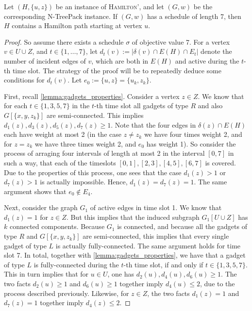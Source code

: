 \documentclass[runningheads]{llncs}
\newcommand{\set}[1]{\{ #1 \}}
\newcommand{\fromto}[2]{\set{#1, \ldots, #2}}
\newcommand{\xxxNTP}{{\sc N-TreePack}}
\begin{document}
\begin{lemma}
\label{lemma:inapprox-only-if}
Let $(H, \set{u, z})$ be an instance of \textsc{Hamilton'}, and let $(G, w)$ be the corresponding {\xxxNTP} instance. If $(G, w)$ has a schedule of length 7, then $H$ contains a Hamilton path starting at vertex $u$.
\end{lemma}
\begin{proof}
 So assume there exists a schedule $\sigma$ of objective value 7. For a vertex $v \in U \cup Z$, and $t \in \fromto{1}{7}$, let $d_t(v) := |\delta(v) \cap E(H) \cap E_t|$ denote the number of incident edges of $v$, which are both in $E(H)$ and active during the $t$-th time slot. The strategy of the proof will be to repeatedly deduce some conditions for $d_t(v)$. Let $e_0 := \set{u, z} = \set{u_k, z_k}$.

First, recall \cref{lemma:gadgets_properties}. Consider a vertex $z \in Z$. We know that for each $t \in \set{1, 3, 5, 7}$ in the $t$-th time slot all gadgets of type $R$ and also $G[\set{x,y,z_k}]$ are semi-connected. This implies $d_1(z), d_3(z), d_5(z), d_7(z) \geq 1$.  Note that the four edges in $\delta(z) \cap E(H)$ each have weight at most 2 (in the case $z \neq z_k$ we have four times weight 2, and for $z = z_k$ we have three times weight 2, and $e_0$ has weight 1). So consider the process of arraging four intervals of length at most 2 in the interval $[0, 7]$ in such a way, that each of the timeslots $[0,1], [2,3], [4,5], [6,7]$ is covered. Due to the properties of this process, one sees that the case $d_1(z) > 1$ or $d_7(z) > 1$ is actually impossible. Hence, $d_1(z) = d_7(z) = 1$. The same argument shows that $e_0 \not\in E_4$.

Next, consider the graph $G_1$ of active edges in time slot 1. We know that  $d_1(z) = 1$ for $z \in Z$. But this implies that the induced subgraph $G_1[U \cup Z]$ has $k$ connected components. Because $G_1$ is connected, and because all the gadgets of type $R$ and $G[\set{x, y, z_k}]$ are semi-connected, this implies that every single gadget of type $L$ is actually fully-connected. The same argument holds for time slot 7. In total, together with \cref{lemma:gadgets_properties}, we have that a gadget of type $L$ is fully-connected during the $t$-th time slot, if and only if $t \in \set{1, 3, 5, 7}$. This in turn implies that for $u \in U$, one has $d_2(u), d_4(u), d_6(u) \geq 1$. The two facts $d_2(u) \geq 1$ and $d_6(u) \geq 1$ together imply $d_4(u) \leq 2$, due to the process described previously. Likewise, for $z \in Z$, the two facts $d_1(z) = 1$ and $d_7(z) = 1$ together imply $d_4(z) \leq 2$.


\end{proof}
\end{document}
